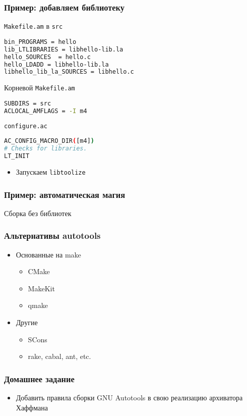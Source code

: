 \begin{frame}
	\frametitle{Пример: добавляем библиотеку}
	\begin{block}{\texttt{Makefile.am} в {\tt src}}
\begin{lstlisting}[language=sh]
bin_PROGRAMS = hello
lib_LTLIBRARIES = libhello-lib.la
hello_SOURCES  = hello.c
hello_LDADD = libhello-lib.la
libhello_lib_la_SOURCES = libhello.c
\end{lstlisting}
	\end{block}

	\begin{block}{Корневой \texttt{Makefile.am}}
\begin{lstlisting}[language=sh]
SUBDIRS = src
ACLOCAL_AMFLAGS = -I m4
\end{lstlisting}
	\end{block}

	\begin{block}{\texttt{configure.ac}}
\begin{lstlisting}[language=sh]
AC_CONFIG_MACRO_DIR([m4])
# Checks for libraries.
LT_INIT
\end{lstlisting}
	\end{block}

	\begin{itemize}
		\item Запускаем {\tt libtoolize} 
	\end{itemize}

\end{frame}

\begin{frame}[fragile]
	\frametitle{Пример: автоматическая магия}
	\begin{block}{Сборка без библиотек}
	\end{block}
\end{frame}


\begin{frame}
 \frametitle{Альтернативы autotools}
\begin{itemize}
  \item{Основанные на make}
  \begin{itemize}
    \item CMake
    \item MakeKit
    \item qmake
  \end{itemize}
  \item{Другие}
    \begin{itemize}
      \item SCons
      \item rake, cabal, ant, etc.
    \end{itemize}
\end{itemize}
\end{frame}

\begin{frame}
 \frametitle{Домашнее задание}
  \begin{itemize}
    \item Добавить правила сборки GNU Autotools в свою реализацию архиватора Хаффмана
  \end{itemize}
\end{frame} 

